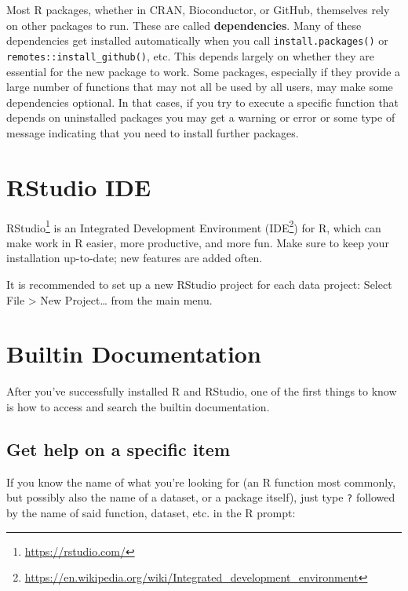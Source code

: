 \documentclass[
]{book}
\DeclareRobustCommand{\href}[2]{#2\footnote{\url{#1}}}
\begin{document}
Most R packages, whether in CRAN, Bioconductor, or GitHub, themselves rely on other packages to run. These are called \textbf{dependencies}. Many of these dependencies get installed automatically when you call \texttt{install.packages()} or \texttt{remotes::install\_github()}, etc. This depends largely on whether they are essential for the new package to work. Some packages, especially if they provide a large number of functions that may not all be used by all users, may make some dependencies optional. In that cases, if you try to execute a specific function that depends on uninstalled packages you may get a warning or error or some type of message indicating that you need to install further packages.

\hypertarget{rstudio-ide}{%
\section{RStudio IDE}\label{rstudio-ide}}

\href{https://rstudio.com/}{RStudio} is an Integrated Development Environment (\href{https://en.wikipedia.org/wiki/Integrated_development_environment}{IDE}) for R, which can make work in R easier, more productive, and more fun. Make sure to keep your installation up-to-date; new features are added often.

It is recommended to set up a new RStudio project for each data project: Select File \textgreater{} New Project\ldots{} from the main menu.

\hypertarget{builtin-documentation}{%
\section{Builtin Documentation}\label{builtin-documentation}}

After you've successfully installed R and RStudio, one of the first things to know is how to access and search the builtin documentation.

\hypertarget{get-help-on-a-specific-item}{%
\subsection{Get help on a specific item}\label{get-help-on-a-specific-item}}

If you know the name of what you're looking for (an R function most commonly, but possibly also the name of a dataset, or a package itself), just type \texttt{?} followed by the name of said function, dataset, etc. in the R prompt:
\end{document}
